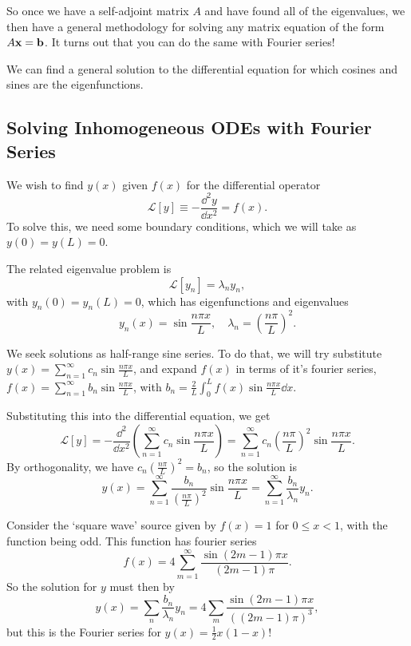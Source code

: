 \documentclass[a4paper]{scrartcl}
\begin{document}
So once we have a self-adjoint matrix $A$ and have found all of the eigenvalues, we then have a general methodology for solving any matrix equation of the form $A \mathbf{x} = \mathbf{b}$. It turns out that you can do the same with Fourier series!

We can find a general solution to the differential equation for which cosines and sines are the eigenfunctions.

\subsection{Solving Inhomogeneous ODEs with Fourier Series}

We wish to find $y(x)$ given $f(x)$ for the differential operator
$$
\mathcal{L}[y] \equiv -\frac{\dd^2 y}{\dd x^2} = f(x).
$$
To solve this, we need some boundary conditions, which we will take as $y(0) = y(L) = 0$.

The related eigenvalue problem is
$$
\mathcal{L}[y_n] = \lambda_n y_n,
$$
with $y_n(0) = y_n(L) = 0$, which has eigenfunctions and eigenvalues
$$
y_n(x) = \sin \frac{n \pi x}{L}, \quad \lambda_n = \left(\frac{n \pi }{L}\right)^2.
$$

We seek solutions as half-range sine series. To do that, we will try substitute $y(x) = \sum_{n = 1}^{\infty} c_n \sin \frac{n \pi x}{L}$, and expand $f(x)$ in terms of it's fourier series, $f(x) = \sum_{n = 1}^{\infty} b_n \sin \frac{n \pi x}{L}$, with $b_n = \frac{2}{L} \int_0^L f(x) \sin \frac{n \pi x}{L} \dd x$.

Substituting this into the differential equation, we get
$$
\mathcal{L}[y] = - \frac{\dd^2}{\dd x^2} \left(\sum_{n = 1}^{\infty} c_n \sin \frac{n \pi x}{L}\right) = \sum_{n = 1}^{\infty} c_n \left(\frac{n \pi}{L}\right)^2 \sin \frac{n \pi x}{L}.
$$
By orthogonality, we have $c_n \left(\frac{n \pi }{L}\right)^2 = b_n$, so the solution is
$$
y(x) = \sum_{n = 1}^{\infty} \frac{b_n}{\left(\frac{n \pi }{L}\right)^2}\sin \frac{n \pi x}{L} = \sum_{n = 1}^{\infty} \frac{b_n}{\lambda_n} y_n.
$$

\begin{example}
    Consider the `square wave' source given by $f(x) = 1$ for $0 \leq x < 1$, with the function being odd. This function has fourier series
    $$
    f(x)=4 \sum_{m=1}^{\infty} \frac{\sin (2 m-1) \pi x}{(2 m-1) \pi}.
    $$
    So the solution for $y$ must then by
    $$
    y(x)=\sum_{n} \frac{b_{n}}{\lambda_{n}} y_{n}=4 \sum_{m} \frac{\sin (2 m-1) \pi x}{((2 m-1) \pi)^{3}},
    $$
    but this is the Fourier series for $y(x) = \frac{1}{2}x(1 - x)$!
\end{example}
\end{document}
